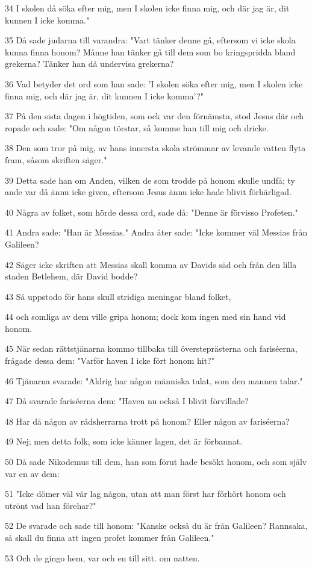 \par 34 I skolen då söka efter mig, men I skolen icke finna mig, och där jag är, dit kunnen I icke komma."
\par 35 Då sade judarna till varandra: "Vart tänker denne gå, eftersom vi icke skola kunna finna honom? Månne han tänker gå till dem som bo kringspridda bland grekerna? Tänker han då undervisa grekerna?
\par 36 Vad betyder det ord som han sade: 'I skolen söka efter mig, men I skolen icke finna mig, och där jag är, dit kunnen I icke komma'?"
\par 37 På den sista dagen i högtiden, som ock var den förnämsta, stod Jesus där och ropade och sade: "Om någon törstar, så komme han till mig och dricke.
\par 38 Den som tror på mig, av hans innersta skola strömmar av levande vatten flyta fram, såsom skriften säger."
\par 39 Detta sade han om Anden, vilken de som trodde på honom skulle undfå; ty ande var då ännu icke given, eftersom Jesus ännu icke hade blivit förhärligad.
\par 40 Några av folket, som hörde dessa ord, sade då: "Denne är förvisso Profeten."
\par 41 Andra sade: "Han är Messias." Andra åter sade: "Icke kommer väl Messias från Galileen?
\par 42 Säger icke skriften att Messias skall komma av Davids säd och från den lilla staden Betlehem, där David bodde?
\par 43 Så uppstodo för hans skull stridiga meningar bland folket,
\par 44 och somliga av dem ville gripa honom; dock kom ingen med sin hand vid honom.
\par 45 När sedan rättstjänarna kommo tillbaka till översteprästerna och fariséerna, frågade dessa dem: "Varför haven I icke fört honom hit?"
\par 46 Tjänarna svarade: "Aldrig har någon människa talat, som den mannen talar."
\par 47 Då svarade fariséerna dem: "Haven nu också I blivit förvillade?
\par 48 Har då någon av rådsherrarna trott på honom? Eller någon av fariséerna?
\par 49 Nej; men detta folk, som icke känner lagen, det är förbannat.
\par 50 Då sade Nikodemus till dem, han som förut hade besökt honom, och som själv var en av dem:
\par 51 "Icke dömer väl vår lag någon, utan att man först har förhört honom och utrönt vad han förehar?"
\par 52 De svarade och sade till honom: "Kanske också du är från Galileen? Rannsaka, så skall du finna att ingen profet kommer från Galileen."
\par 53 Och de gingo hem, var och en till sitt. om natten.

